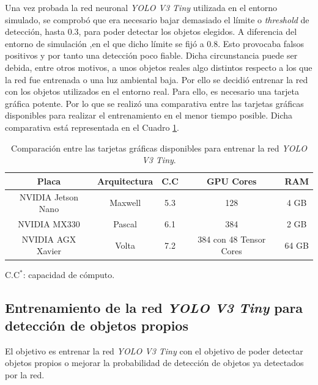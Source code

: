 Una vez probada la red neuronal \textit{YOLO V3 Tiny} utilizada en el entorno simulado, se comprobó que era necesario bajar demasiado el límite o \textit{threshold} de detección, hasta 0.3, para poder detectar los objetos elegidos. A diferencia del entorno de simulación ,en el que dicho límite se fijó a 0.8. Esto provocaba falsos positivos y por tanto una detección poco fiable. Dicha circunstancia puede ser debida, entre otros motivos, a unos objetos reales algo distintos respecto a los que la red fue entrenada o una luz ambiental baja. Por ello se decidió entrenar la red con los objetos utilizados en el entorno real. Para ello, es necesario una tarjeta gráfica potente. Por lo que se realizó una comparativa entre las tarjetas gráficas disponibles para realizar el entrenamiento en el menor tiempo posible. Dicha comparativa está representada en el Cuadro \ref{table:versusnvidia}.\\

\begin{table}[H]
	\begin{center}
		\begin{tabular}{|c|c|c|c|c|}
			\hline
			\textbf{Placa}	& \textbf{Arquitectura} & \textbf{C.C\makebox[0pt][l]{$^*$}} & \textbf{GPU Cores}				& \textbf{RAM}
			\\
			\hline
			NVIDIA Jetson Nano		& Maxwell								& 5.3														& 128												& 4 GB
			\\
			NVIDIA MX330					& Pascal								& 6.1														& 384												& 2 GB
			\\
			NVIDIA AGX Xavier			& Volta									& 7.2														& 384 con 48 Tensor Cores		& 64 GB
			\\
			\hline
		\end{tabular}
		\parbox[t]{\textwidth}{\footnotesize C.C$^*$: capacidad de cómputo.}  
		\caption{Comparación entre las tarjetas gráficas disponibles para entrenar la red \textit{YOLO V3 Tiny}.}
		\label{table:versusnvidia}
	\end{center}
\end{table}

\subsection{Entrenamiento de la red \textit{YOLO V3 Tiny} para detección de objetos propios}
El objetivo es entrenar la red \textit{YOLO V3 Tiny} con el objetivo de poder detectar objetos propios o mejorar la probabilidad de detección de objetos ya detectados por la red.\\

